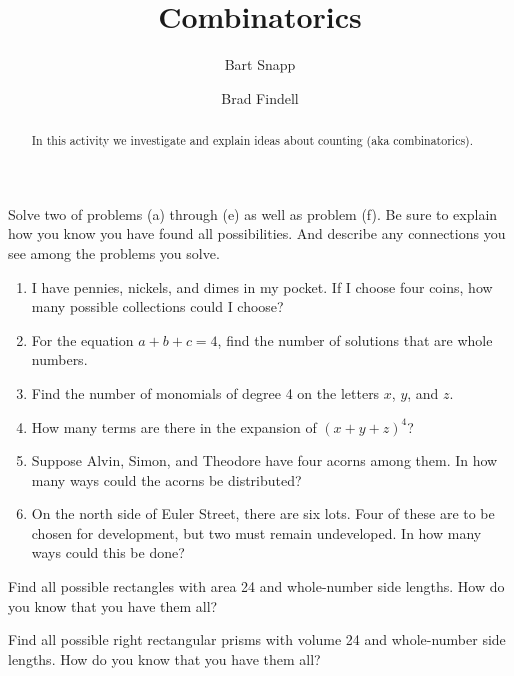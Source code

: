 \documentclass[nooutcomes,noauthor]{ximera}
\title{Combinatorics}
\author{Bart Snapp \and Brad Findell}
\begin{document}
\begin{abstract}
In this activity we investigate and explain ideas about counting (aka combinatorics).
\end{abstract}
\maketitle


\begin{problem}
Solve two of problems (a) through (e) as well as problem (f).  Be sure to explain how you know you have found all possibilities. And describe any connections you see among the problems you solve.
\begin{enumerate}
\item I have pennies, nickels, and dimes in my pocket.  If I choose four coins, how many possible collections could I choose?
\item For the equation $a + b + c = 4$, find the number of solutions that are whole numbers.
\item Find the number of monomials of degree 4 on the letters $x$, $y$, and $z$.  
\item How many terms are there in the expansion of $(x + y + z)^4$?
\item Suppose Alvin, Simon, and Theodore have four acorns among them.  In how many ways could the acorns be distributed?  
\item On the north side of Euler Street, there are six lots.  Four of these are to be chosen for development, but two must remain undeveloped.  In how many ways could this be done?
\end{enumerate}
\end{problem}

\begin{problem}
Find all possible rectangles with area 24 and whole-number side lengths.  How do you know that you have them all?
\end{problem}

\begin{problem}
Find all possible right rectangular prisms with volume 24 and whole-number side lengths.  How do you know that you have them all?  
\end{problem}
\end{document}

